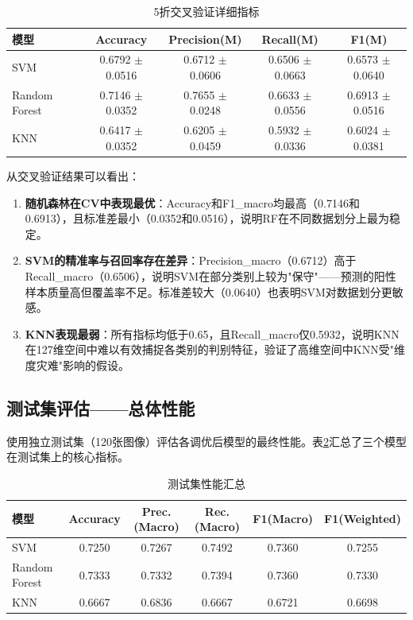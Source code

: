 \documentclass[12pt,a4paper]{ctexart}
\begin{document}
\begin{table}[H]
\centering
\caption{5折交叉验证详细指标}
\label{tab:cv_detailed}
\begin{tabular}{lcccc}
\toprule
\textbf{模型} & \textbf{Accuracy} & \textbf{Precision(M)} & \textbf{Recall(M)} & \textbf{F1(M)} \\
\midrule
SVM           & 0.6792 $\pm$ 0.0516 & 0.6712 $\pm$ 0.0606 & 0.6506 $\pm$ 0.0663 & 0.6573 $\pm$ 0.0640 \\
Random Forest & 0.7146 $\pm$ 0.0352 & 0.7655 $\pm$ 0.0248 & 0.6633 $\pm$ 0.0556 & 0.6913 $\pm$ 0.0516 \\
KNN           & 0.6417 $\pm$ 0.0352 & 0.6205 $\pm$ 0.0459 & 0.5932 $\pm$ 0.0336 & 0.6024 $\pm$ 0.0381 \\
\bottomrule
\end{tabular}
\end{table}

从交叉验证结果可以看出：
\begin{enumerate}[label=(\arabic*)]
    \item \textbf{随机森林在CV中表现最优}：Accuracy和F1\_macro均最高（0.7146和0.6913），且标准差最小（0.0352和0.0516），说明RF在不同数据划分上最为稳定。
    \item \textbf{SVM的精准率与召回率存在差异}：Precision\_macro（0.6712）高于Recall\_macro（0.6506），说明SVM在部分类别上较为"保守"——预测的阳性样本质量高但覆盖率不足。标准差较大（0.0640）也表明SVM对数据划分更敏感。
    \item \textbf{KNN表现最弱}：所有指标均低于0.65，且Recall\_macro仅0.5932，说明KNN在127维空间中难以有效捕捉各类别的判别特征，验证了高维空间中KNN受"维度灾难"影响的假设。
\end{enumerate}

\subsection{测试集评估——总体性能}

使用独立测试集（120张图像）评估各调优后模型的最终性能。表\ref{tab:test_summary}汇总了三个模型在测试集上的核心指标。

\begin{table}[H]
\centering
\caption{测试集性能汇总}
\label{tab:test_summary}
\begin{tabular}{lccccc}
\toprule
\textbf{模型} & \textbf{Accuracy} & \textbf{Prec.(Macro)} & \textbf{Rec.(Macro)} & \textbf{F1(Macro)} & \textbf{F1(Weighted)} \\
\midrule
SVM           & 0.7250 & 0.7267 & 0.7492 & 0.7360 & 0.7255 \\
Random Forest & 0.7333 & 0.7332 & 0.7394 & 0.7360 & 0.7330 \\
KNN           & 0.6667 & 0.6836 & 0.6667 & 0.6721 & 0.6698 \\
\bottomrule
\end{tabular}
\end{table}
\end{document}
